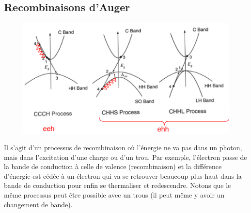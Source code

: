 	
	\subsection{Recombinaisons d'Auger}	
	\begin{figure}
	\vspace{-5mm}
	\includegraphics[scale=0.6]{ch5/image31}
	\end{figure}		
	Il s'agit d'un processus de recombinaison où l'énergie ne va pas dans un photon, mais dans 
	l'excitation d'une charge ou d'un trou. Par exemple, l'électron passe de la bande de 
	conduction à celle de valence (recombinaison) et la différence d'énergie est cédée à un 
	électron qui va se retrouver beaucoup plus haut dans la bande de conduction pour enfin 
	se thermaliser et redescendre. Notons que le même processus peut être possible avec un trous 
	(il peut même y avoir un changement de bande).\\
	
